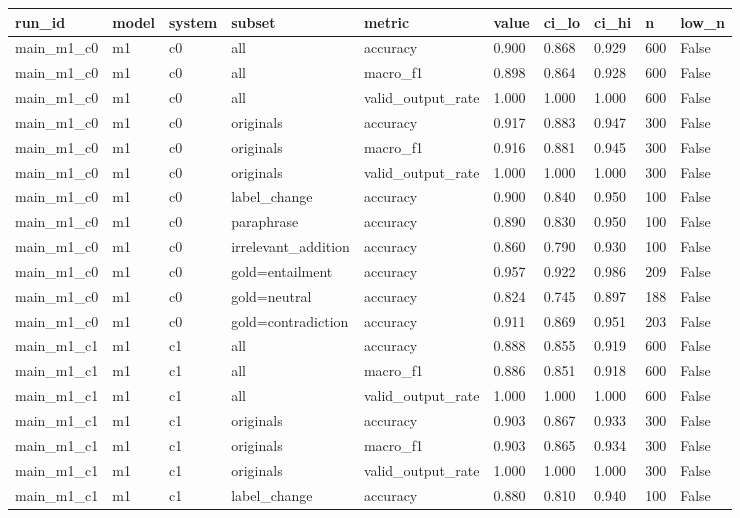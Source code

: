 \begin{tabular}{llllllllll}
\toprule
run\_id & model & system & subset & metric & value & ci\_lo & ci\_hi & n & low\_n \\
\midrule
main\_m1\_c0 & m1 & c0 & all & accuracy & 0.900 & 0.868 & 0.929 & 600 & False \\
main\_m1\_c0 & m1 & c0 & all & macro\_f1 & 0.898 & 0.864 & 0.928 & 600 & False \\
main\_m1\_c0 & m1 & c0 & all & valid\_output\_rate & 1.000 & 1.000 & 1.000 & 600 & False \\
main\_m1\_c0 & m1 & c0 & originals & accuracy & 0.917 & 0.883 & 0.947 & 300 & False \\
main\_m1\_c0 & m1 & c0 & originals & macro\_f1 & 0.916 & 0.881 & 0.945 & 300 & False \\
main\_m1\_c0 & m1 & c0 & originals & valid\_output\_rate & 1.000 & 1.000 & 1.000 & 300 & False \\
main\_m1\_c0 & m1 & c0 & label\_change & accuracy & 0.900 & 0.840 & 0.950 & 100 & False \\
main\_m1\_c0 & m1 & c0 & paraphrase & accuracy & 0.890 & 0.830 & 0.950 & 100 & False \\
main\_m1\_c0 & m1 & c0 & irrelevant\_addition & accuracy & 0.860 & 0.790 & 0.930 & 100 & False \\
main\_m1\_c0 & m1 & c0 & gold=entailment & accuracy & 0.957 & 0.922 & 0.986 & 209 & False \\
main\_m1\_c0 & m1 & c0 & gold=neutral & accuracy & 0.824 & 0.745 & 0.897 & 188 & False \\
main\_m1\_c0 & m1 & c0 & gold=contradiction & accuracy & 0.911 & 0.869 & 0.951 & 203 & False \\
main\_m1\_c1 & m1 & c1 & all & accuracy & 0.888 & 0.855 & 0.919 & 600 & False \\
main\_m1\_c1 & m1 & c1 & all & macro\_f1 & 0.886 & 0.851 & 0.918 & 600 & False \\
main\_m1\_c1 & m1 & c1 & all & valid\_output\_rate & 1.000 & 1.000 & 1.000 & 600 & False \\
main\_m1\_c1 & m1 & c1 & originals & accuracy & 0.903 & 0.867 & 0.933 & 300 & False \\
main\_m1\_c1 & m1 & c1 & originals & macro\_f1 & 0.903 & 0.865 & 0.934 & 300 & False \\
main\_m1\_c1 & m1 & c1 & originals & valid\_output\_rate & 1.000 & 1.000 & 1.000 & 300 & False \\
main\_m1\_c1 & m1 & c1 & label\_change & accuracy & 0.880 & 0.810 & 0.940 & 100 & False \\

\end{tabular}
